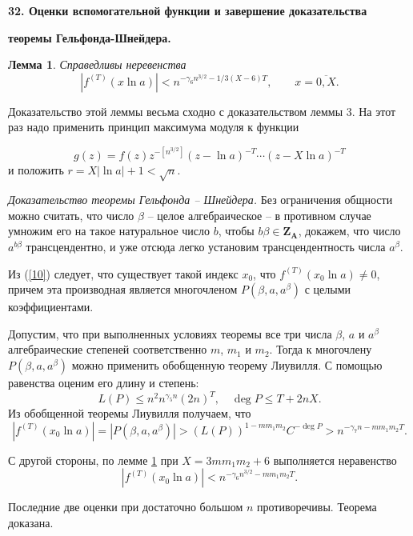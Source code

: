 \documentclass[12pt]{article}
\newtheorem{lemma}{Лемма}
\let\ol\overline
\begin{document}
\vskip 5mm \centerline{\bf { 32. Оценки вспомогательной функции и
завершение доказательства}} \centerline{\bf {теоремы
Гельфонда-Шнейдера. }} \vskip 5mm


\begin{lemma}\label{S}
   Справедливы неревенства
$$
|f^{(T)}(x \ln a)| < n^{-\gamma_6n^{3/2}-1/3(X-6)T}, \qquad
x=\ol{0,X}.
$$

\end{lemma}

 Доказательство этой леммы весьма сходно с
доказательством леммы 3. На этот раз надо
применить принцип максимума модуля к функции

$$
g(z)=f(z)z^{-[n^{3/2}]}(z-\ln a)^{-T} \cdots (z-X\ln a)^{-T}
$$
и положить $r=X|\ln a|+1<\sqrt n$.


\emph{Доказательство теоремы Гельфонда --
Шнейдера. } Без ограничения общности можно
считать, что число $\beta$ -- целое
алгебраическое -- в противном случае умножим его
на такое натуральное число $b$,  чтобы $b\beta
\in\mathbf Z_{\mathbf A}$, докажем, что число
$a^{b\beta}$ трансцендентно, и уже отсюда легко
установим трансцендентность числа $a^{\beta}$.

 Из (\ref{10}) следует, что существует
такой индекс $x_0$, что $f^{(T)}(x_0\ln a) \ne 0$, причем эта
производная является многочленом $P(\beta, a, a^{\beta})$ с целыми
коэффициентами.

Допустим, что при выполненных условиях теоремы все три числа
$\beta$, $a$   и $a^{\beta}$  алгебраические степеней
соответственно $m$, $m_1$ и  $m_2$. Тогда к многочлену $P(\beta,
a, a^{\beta}) $ можно применить обобщенную теорему Лиувилля. С
помощью равенства  оценим его длину и степень:
$$
L(P) \le n^2n^{\gamma_5n}(2n)^T, \quad \deg P \le T+2nX.
$$
Из обобщенной теоремы Лиувилля получаем, что
$$
|f^{(T)}(x_0\ln a)|=|P(\beta, a, a^{\beta})|>
(L(P))^{1-mm_1m_2}C^{-\deg P} > n^{-\gamma_7n-mm_1m_2T}.
$$

С другой стороны, по лемме \ref{S} при
$X=3mm_1m_2+6$ выполняется неравенство
$$
|f^{(T)}(x_0\ln a)| <n^{-\gamma_6n^{3/2}-mm_1m_2T}.
$$

Последние две оценки при достаточно большом $n$ противоречивы.
Теорема доказана.
\end{document}
